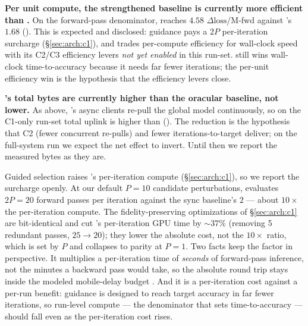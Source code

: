 \textbf{Per unit compute, the strengthened baseline is currently more
efficient than \sys{}.} On the forward-pass denominator, \fwdllmito{}
reaches $4.58$ $\Delta\text{loss}$/M-fwd against \sys{}'s $1.68$
(). This is expected and disclosed: guidance
pays a $2P$ per-iteration surcharge (\S\ref{sec:arch:c1}), and \sys{}
trades per-compute efficiency for wall-clock speed with its C2/C3
efficiency levers \emph{not yet enabled} in this run-set. \sys{} still
wins wall-clock time-to-accuracy because it needs far fewer
iterations; the per-unit efficiency win is the hypothesis that the
efficiency levers close. 

\textbf{\sys{}'s total bytes are currently higher than the oracular
baseline, not lower.} As above, \sys{}'s async clients re-pull the
global model continuously, so on the C1-only run-set total uplink is
higher than \fwdllmito{} (). The reduction is
the hypothesis that C2 (fewer concurrent re-pulls) and fewer
iterations-to-target deliver; on the full-system run we expect the net
effect to invert. Until then we report the measured bytes as they are.

Guided selection raises \sys{}'s per-iteration compute
(\S\ref{sec:arch:c1}), so we report the surcharge openly. At our
default $P=10$ candidate perturbations, \sys{} evaluates $2P=20$
forward passes per iteration against the sync baseline's $2$ --- about
$10\times$ the per-iteration compute. The fidelity-preserving
optimizations of \S\ref{sec:arch:c1} are bit-identical and cut
\sys{}'s per-iteration GPU time by ${\sim}37\%$ (removing 5 redundant
passes, $25\to20$); they lower the absolute cost, not the $10\times$
ratio, which is set by $P$ and collapses to parity at $P=1$. Two facts
keep the factor in perspective. It multiplies a per-iteration time of
\emph{seconds} of forward-pass inference, not the minutes a backward
pass would take, so the absolute round trip stays inside the modeled
mobile-delay budget . And it
is a per-iteration cost against a per-run benefit: guidance is
designed to reach target accuracy in far fewer iterations, so
run-level compute --- the denominator that sets time-to-accuracy ---
should fall even as the per-iteration cost rises.

